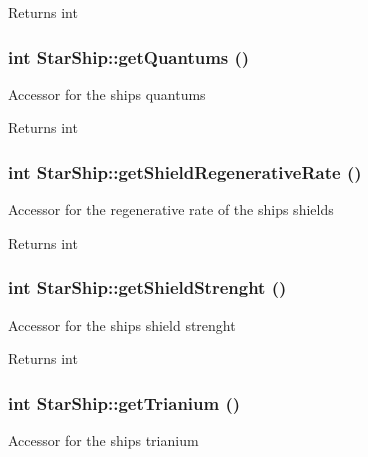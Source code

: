 \begin{DoxyReturn}{Returns}
int 
\end{DoxyReturn}
\hypertarget{classStarShip_a5859482046dae7a0ac2ad18c5714f6eb}{
\subsubsection[{getQuantums}]{\setlength{\rightskip}{0pt plus 5cm}int StarShip::getQuantums ()}}
\label{da/d97/classStarShip_a5859482046dae7a0ac2ad18c5714f6eb}
Accessor for the ships quantums

\begin{DoxyReturn}{Returns}
int 
\end{DoxyReturn}
\hypertarget{classStarShip_a6c5cf11fb023e98a6e23d7be9d41a984}{
\subsubsection[{getShieldRegenerativeRate}]{\setlength{\rightskip}{0pt plus 5cm}int StarShip::getShieldRegenerativeRate ()}}
\label{da/d97/classStarShip_a6c5cf11fb023e98a6e23d7be9d41a984}
Accessor for the regenerative rate of the ships shields

\begin{DoxyReturn}{Returns}
int 
\end{DoxyReturn}
\hypertarget{classStarShip_a34a3514784bb0bdb7a7688c5ff6ad033}{
\subsubsection[{getShieldStrenght}]{\setlength{\rightskip}{0pt plus 5cm}int StarShip::getShieldStrenght ()}}
\label{da/d97/classStarShip_a34a3514784bb0bdb7a7688c5ff6ad033}
Accessor for the ships shield strenght

\begin{DoxyReturn}{Returns}
int 
\end{DoxyReturn}
\hypertarget{classStarShip_a2cc968a0cf44328b29d79e7d4c30c013}{
\subsubsection[{getTrianium}]{\setlength{\rightskip}{0pt plus 5cm}int StarShip::getTrianium ()}}
\label{da/d97/classStarShip_a2cc968a0cf44328b29d79e7d4c30c013}
Accessor for the ships trianium

